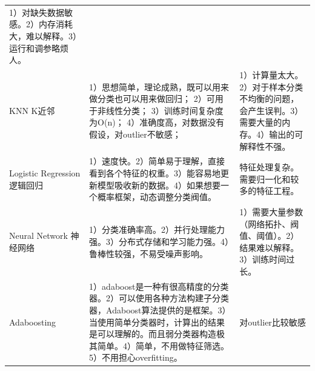 \begin{longtable}[]{lll}
\begin{minipage}[t]{0.04\columnwidth}
1）对缺失数据敏感。2）内存消耗大，难以解释。3）运行和调参略烦人。\strut
\end{minipage}\tabularnewline
\begin{minipage}[t]{0.04\columnwidth}\raggedright\strut
KNN K近邻\strut
\end{minipage} & \begin{minipage}[t]{0.04\columnwidth}\raggedright\strut
1）思想简单，理论成熟，既可以用来做分类也可以用来做回归；
2）可用于非线性分类； 3）训练时间复杂度为O(n)；
4）准确度高，对数据没有假设，对outlier不敏感；\strut
\end{minipage} & \begin{minipage}[t]{0.04\columnwidth}\raggedright\strut
1）计算量太大。2）对于样本分类不均衡的问题，会产生误判。3）需要大量的内存。4）输出的可解释性不强。\strut
\end{minipage}\tabularnewline
\begin{minipage}[t]{0.04\columnwidth}\raggedright\strut
Logistic Regression逻辑回归\strut
\end{minipage} & \begin{minipage}[t]{0.04\columnwidth}\raggedright\strut
1）速度快。2）简单易于理解，直接看到各个特征的权重。3）能容易地更新模型吸收新的数据。4）如果想要一个概率框架，动态调整分类阀值。\strut
\end{minipage} & \begin{minipage}[t]{0.04\columnwidth}\raggedright\strut
特征处理复杂。需要归一化和较多的特征工程。\strut
\end{minipage}\tabularnewline
\begin{minipage}[t]{0.04\columnwidth}\raggedright\strut
Neural Network 神经网络\strut
\end{minipage} & \begin{minipage}[t]{0.04\columnwidth}\raggedright\strut
1）分类准确率高。2）并行处理能力强。3）分布式存储和学习能力强。4）鲁棒性较强，不易受噪声影响。\strut
\end{minipage} & \begin{minipage}[t]{0.04\columnwidth}\raggedright\strut
1）需要大量参数（网络拓扑、阀值、阈值）。2）结果难以解释。3）训练时间过长。\strut
\end{minipage}\tabularnewline
\begin{minipage}[t]{0.04\columnwidth}\raggedright\strut
Adaboosting\strut
\end{minipage} & \begin{minipage}[t]{0.04\columnwidth}\raggedright\strut
1）adaboost是一种有很高精度的分类器。2）可以使用各种方法构建子分类器，Adaboost算法提供的是框架。3）当使用简单分类器时，计算出的结果是可以理解的。而且弱分类器构造极其简单。4）简单，不用做特征筛选。5）不用担心overfitting。\strut
\end{minipage} & \begin{minipage}[t]{0.04\columnwidth}\raggedright\strut
对outlier比较敏感\strut
\end{minipage}\tabularnewline
\end{longtable}

